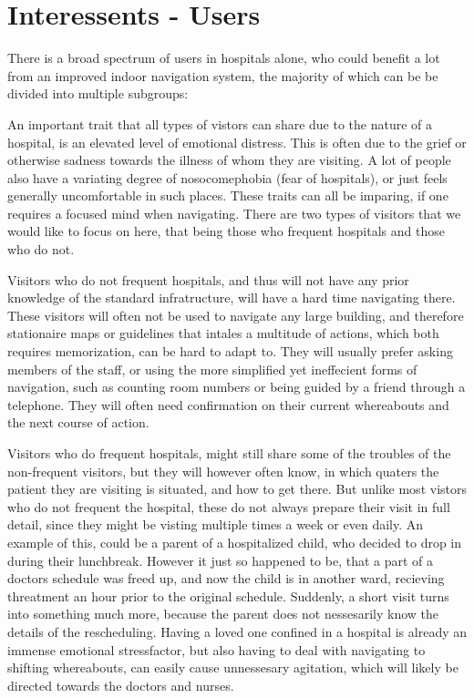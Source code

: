 \section{Interessents - Users} %
\label{sec:interusers}


\begin{Interessents - Users}

There is a broad spectrum of users in hospitals alone, who could benefit a lot from an improved indoor navigation system, the majority of which can be be divided into multiple subgroups:

\item[Visitors] An important trait that all types of vistors can share due to the nature of a hospital, is an elevated level of emotional distress. This is often due to the grief or otherwise sadness towards the illness of whom they are visiting. A lot of people also have a variating degree of nosocomephobia (fear of hospitals), or just feels generally uncomfortable in such places. These traits can all be imparing, if one requires a focused mind when navigating. There are two types of visitors that we would like to focus on here, that being those who frequent hospitals and those who do not.

Visitors who do not frequent hospitals, and thus will not have any prior knowledge of the standard infratructure, will have a hard time navigating there. These visitors will often not be used to navigate any large building, and therefore stationaire maps or guidelines that intales a multitude of actions, which both requires memorization, can be hard to adapt to. They will usually prefer asking members of the staff, or using the more simplified yet ineffecient forms of navigation, such as counting room numbers or being guided by a friend through a telephone. They will often need confirmation on their current whereabouts and the next course of action.

Visitors who do frequent hospitals, might still share some of the troubles of the non-frequent visitors, but they will however often know, in which quaters the patient they are visiting is situated, and how to get there. But unlike most vistors who do not frequent the hospital, these do not always prepare their visit in full detail, since they might be visting multiple times a week or even daily. An example of this, could be a parent of a hospitalized child, who decided to drop in during their lunchbreak. However it just so happened to be, that a part of a doctors schedule was freed up, and now the child is in another ward, recieving threatment an hour prior to the original schedule. Suddenly, a short visit turns into something much more, because the parent does not nessesarily know the details of the rescheduling. Having a loved one confined in a hospital is already an immense emotional stressfactor, but also having to deal with navigating to shifting whereabouts, can easily cause unnessesary agitation, which will likely be directed towards the doctors and nurses.


\end{Interessents - Users}
